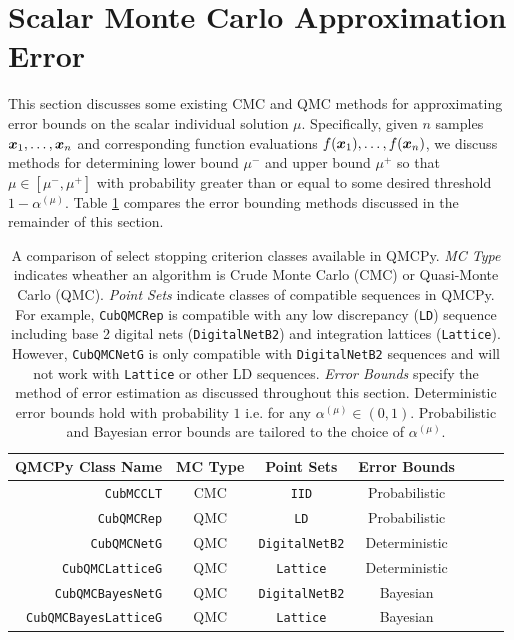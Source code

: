 \documentclass{article}[12pt]
\begin{document}
\section{Scalar Monte Carlo Approximation Error}\label{sec:Existing_QMC_Methods}

This section discusses some existing CMC and QMC methods for approximating error bounds on the scalar individual solution $\mu$. Specifically, given $n$ samples $\boldsymbol{x}_1,\dots,\boldsymbol{x}_n$ and corresponding function evaluations $f(\boldsymbol{x}_1),\dots,f(\boldsymbol{x}_n)$, we discuss methods for determining lower bound $\mu^-$ and upper bound $\mu^+$ so that $\mu \in [\mu^-,\mu^+]$ with probability greater than or equal to some desired threshold $1-\alpha^{(\mu)}$. Table \ref{table:qmcpy_sc} compares the error bounding methods discussed in the remainder of this section.

\begin{table}[H]
\centering
\begin{tabular}{r c c c c c c}
    QMCPy Class Name & MC Type & Point Sets & Error Bounds \\
    \hline
    \texttt{CubMCCLT} \cite{cubmcg} & CMC & \texttt{IID} & Probabilistic \\
    \texttt{CubQMCRep} \cite{mcbook} & QMC & \texttt{LD} & Probabilistic \\
    \texttt{CubQMCNetG} \cite{cubqmcsobol} & QMC & \texttt{DigitalNetB2} & Deterministic \\
    \texttt{CubQMCLatticeG} \cite{cubqmclattice} & QMC & \texttt{Lattice} & Deterministic \\
    \texttt{CubQMCBayesNetG} \cite{JagThesis19a} & QMC &  \texttt{DigitalNetB2} & Bayesian \\
    \texttt{CubQMCBayesLatticeG} \cite{cubqmcbayeslattice} & QMC & \texttt{Lattice} & Bayesian \\
    \hline
\end{tabular}
\caption{A comparison of select stopping criterion classes available in QMCPy. \emph{MC Type} indicates wheather an algorithm is Crude Monte Carlo (CMC) or Quasi-Monte Carlo (QMC). \emph{Point Sets} indicate classes of compatible sequences in QMCPy. For example, \texttt{CubQMCRep} is compatible with any low discrepancy (\texttt{LD}) sequence including base 2 digital nets (\texttt{DigitalNetB2}) and integration lattices (\texttt{Lattice}). However, \texttt{CubQMCNetG} is only compatible with \texttt{DigitalNetB2} sequences and will not work with \texttt{Lattice} or other LD sequences. \emph{Error Bounds} specify the method of error estimation as discussed throughout this section. Deterministic error bounds hold with probability $1$ i.e. for any $\alpha^{(\mu)} \in (0,1)$. Probabilistic and Bayesian error bounds are tailored to the choice of $\alpha^{(\mu)}$.}
\label{table:qmcpy_sc}
\end{table}
\end{document}

